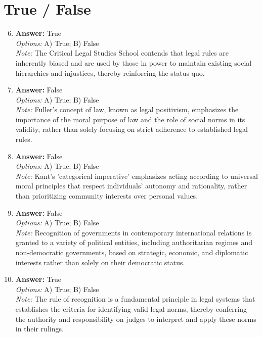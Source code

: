 \documentclass[12pt]{article}
\begin{document}
\section*{True / False}
\begin{enumerate}[label=\arabic*.]
\setcounter{enumi}{5}
\item \textbf{Answer:} True
\\ \textit{Options:} A) True; B) False
\\ \textit{Note:} The Critical Legal Studies School contends that legal rules are inherently biased and are used by those in power to maintain existing social hierarchies and injustices, thereby reinforcing the status quo.
\item \textbf{Answer:} False
\\ \textit{Options:} A) True; B) False
\\ \textit{Note:} Fuller's concept of law, known as legal positivism, emphasizes the importance of the moral purpose of law and the role of social norms in its validity, rather than solely focusing on strict adherence to established legal rules.
\item \textbf{Answer:} False
\\ \textit{Options:} A) True; B) False
\\ \textit{Note:} Kant's 'categorical imperative' emphasizes acting according to universal moral principles that respect individuals' autonomy and rationality, rather than prioritizing community interests over personal values.
\item \textbf{Answer:} False
\\ \textit{Options:} A) True; B) False
\\ \textit{Note:} Recognition of governments in contemporary international relations is granted to a variety of political entities, including authoritarian regimes and non-democratic governments, based on strategic, economic, and diplomatic interests rather than solely on their democratic status.
\item \textbf{Answer:} True
\\ \textit{Options:} A) True; B) False
\\ \textit{Note:} The rule of recognition is a fundamental principle in legal systems that establishes the criteria for identifying valid legal norms, thereby conferring the authority and responsibility on judges to interpret and apply these norms in their rulings.
\end{enumerate}
\end{document}
